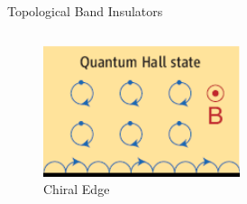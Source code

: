 \begin{frame}{Topological Band Insulators}
\begin{columns}[T]
\begin{column}[T]{0.35\textwidth}
{\begin{figure}
\includegraphics[width=\linewidth]{diagrams/bernevig2.png}
\caption{Chiral Edge}
\end{figure} 
}
\end{column}
\end{columns}

\end{frame}